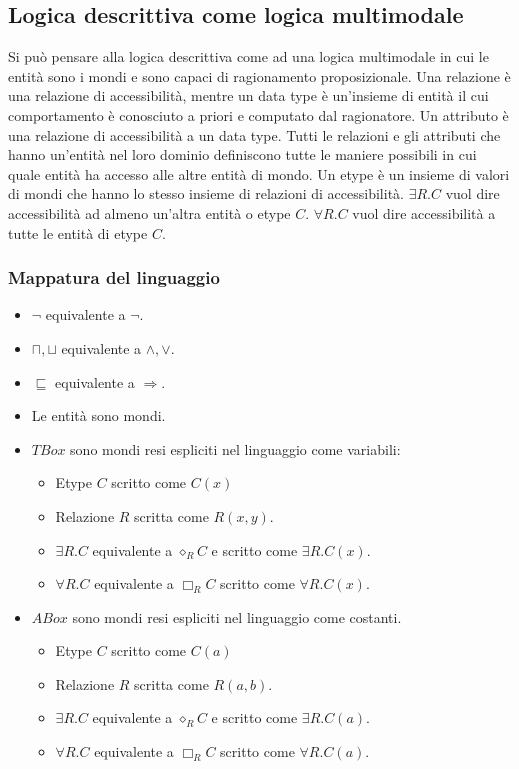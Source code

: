 \subsection{Logica descrittiva come logica multimodale}
Si pu\`o pensare alla logica descrittiva come ad una logica multimodale in cui le entit\`a sono i mondi e sono capaci di ragionamento proposizionale. Una relazione \`e una relazione di accessibilit\`a, mentre
un data type \`e un'insieme di entit\`a il cui comportamento \`e conosciuto a priori e computato dal ragionatore. Un attributo \`e una relazione di accessibilit\`a a un data type. Tutti le relazioni e gli attributi che
hanno un'entit\`a nel loro dominio definiscono tutte le maniere possibili in cui quale entit\`a ha accesso alle altre entit\`a di mondo. Un etype \`e un insieme di valori di mondi che hanno lo stesso insieme di 
relazioni di accessibilit\`a. $\exists R.C$ vuol dire accessibilit\`a ad almeno un'altra entit\`a o etype $C$. $\forall R.C$ vuol dire accessibilit\`a a tutte le entit\`a di etype $C$.
\subsubsection{Mappatura del linguaggio}
\begin{itemize}
\item $\neg$ equivalente a $\neg$.
\item $\sqcap, \sqcup$ equivalente a $\land, \lor$.
\item $\sqsubseteq$ equivalente a $\Rightarrow$.
\item Le entit\`a sono mondi.
\item $TBox$ sono mondi resi espliciti nel linguaggio come variabili:
\begin{itemize}
\item Etype $C$ scritto come $C(x)$
\item Relazione $R$ scritta come $R(x,y)$.
\item $\exists R.C$ equivalente a $\diamond_RC$ e scritto come $\exists R.C(x)$.
\item $\forall R.C$ equivalente a $\Box_RC$ scritto come $\forall R.C(x)$.
\end{itemize}
\item $ABox$ sono mondi resi espliciti nel linguaggio come costanti.
\begin{itemize}
\item Etype $C$ scritto come $C(a)$
\item Relazione $R$ scritta come $R(a,b)$.
\item $\exists R.C$ equivalente a $\diamond_RC$ e scritto come $\exists R.C(a)$.
\item $\forall R.C$ equivalente a $\Box_RC$ scritto come $\forall R.C(a)$.
\end{itemize}
\end{itemize}
